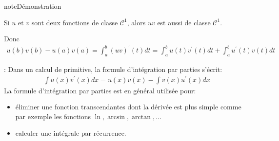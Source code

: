 \documentclass[letterpaper,10pt,french]{jupyterBook}
\begin{document}
\begin{sphinxadmonition}{note}{Démonstration}

\sphinxAtStartPar
Si \(u\) et \(v\) sont deux fonctions de classe \(\mathcal C^1\), alors \(uv\) est aussi de classe \(\mathcal C^1\).

\sphinxAtStartPar
Donc
\begin{equation*}
\begin{split}
u(b)v(b)- u(a)v(a) = \int_a^b (uv)^{'}(t)dt = \int_a^b u(t)v^{'}(t)dt + \int_a^b u^{'}(t)v(t)dt
\end{split}
\end{equation*}\end{sphinxadmonition}

\sphinxAtStartPar
{}: Dans un calcul de primitive, la formule d’intégration par parties s’écrit:
\begin{equation*}
\begin{split}
\int u(x)v^{'}(x)dx = u(x)v(x) - \int v(x)u^{'}(x)dx
\end{split}
\end{equation*}
\sphinxAtStartPar
La formule d’intégration par parties est en général utilisée pour:
\begin{itemize}
\item {} 
\sphinxAtStartPar
éliminer une fonction transcendantes dont la dérivée est plus simple comme par exemple les fonctions \(\ln, \arcsin, \arctan,\ldots\)

\item {} 
\sphinxAtStartPar
calculer une intégrale par récurrence.

\end{itemize}
\end{document}
